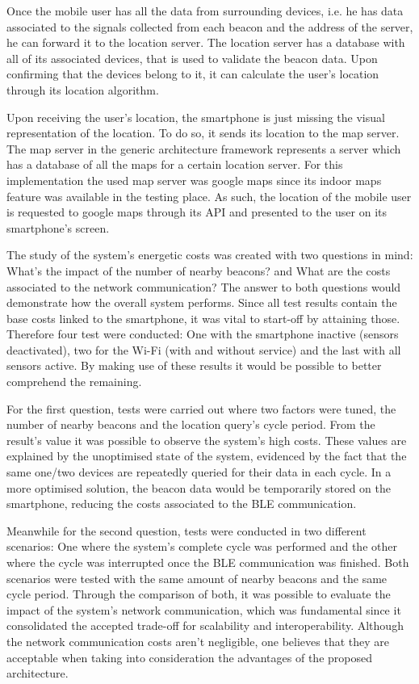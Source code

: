  
Once the mobile user has all the data from surrounding devices, i.e. he has data associated to the signals collected from each beacon and the address of the server, he can forward it to the location server. The location server has a database with all of its associated devices, that is used to validate the beacon data. Upon confirming that the devices belong to it, it can calculate the user's location through its location algorithm.  
 
 
Upon receiving the user's location, the smartphone is just missing the visual representation of the location. To do so, it sends its location to the map server. The map server in the generic architecture framework represents a server which has a database of all the maps for a certain location server. For this implementation the used map server was google maps since its indoor maps feature was available in the testing place. As such, the location of the mobile user is requested to google maps through its API and presented to the user on its smartphone's screen. 
 
 
The study of the system's energetic costs was created with two questions in mind: What's the impact of the number of nearby beacons? and What are the costs associated to the network communication? The answer to both questions would demonstrate how the overall system performs. 
Since all test results contain the base costs linked to the smartphone, it was vital to start-off by attaining those. Therefore four test were conducted: One with the smartphone inactive (sensors deactivated), two for the Wi-Fi (with and without service) and the last with all sensors active. By making use of these results it would be possible to better comprehend the remaining. 
 
 
For the first question, tests were carried out where two factors were tuned, the number of nearby beacons and the location query's cycle period. From the result's value it was possible to observe the system's high costs. These values are explained by the unoptimised state of the system, evidenced by the fact that the same one/two devices are repeatedly queried for their data in each cycle. In a more optimised solution, the beacon data would be temporarily stored on the smartphone, reducing the costs associated to the \ac{BLE} communication. 
 
 
Meanwhile for the second question, tests were conducted in two different scenarios: One where the system's complete cycle was performed and the other where the cycle was interrupted once the \ac{BLE} communication was finished. Both scenarios were tested with the same amount of nearby beacons and the same cycle period. Through the comparison of both, it was possible to evaluate the impact of the system's network communication, which was fundamental since it consolidated the accepted trade-off for scalability and interoperability. Although the network communication costs aren't negligible, one believes that they are acceptable when taking into consideration the advantages of the proposed architecture.
 